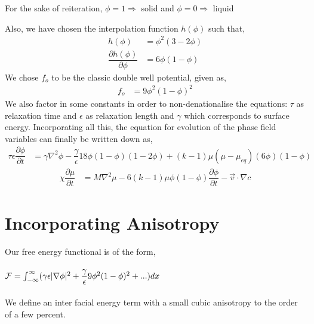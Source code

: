 \documentclass[a4paper]{report}
\begin{document}
For the sake of reiteration,
$\phi = 1 \Longrightarrow$ solid and $\phi = 0 \Longrightarrow$ liquid

Also, we have chosen the interpolation function $h(\phi)$ such that,
\begin{align}
	h(\phi) &= \phi^2\left(3 - 2 \phi\right) \\
	\dfrac{\partial h(\phi)}{\partial \phi} &= 6\phi\left(1-\phi\right)
	\label{interpolation functions}
\end{align}
We chose $f_o$ to be the classic double well potential, given as,
\begin{align}
	f_o &= 9\phi^2\left(1-\phi\right)^2
\end{align}
We also factor in some constants in order to non-denationalise the equations: $\tau$ as relaxation
time and $\epsilon$ as relaxation length and $\gamma$ which corresponds to surface energy.
Incorporating all this, the equation for evolution of the phase field variables 
can finally be written down as,
\begin{align}
\tau\epsilon\dfrac{\partial\phi}{\partial t} &= \gamma\nabla^{2}\phi -\dfrac{\gamma}{\epsilon}18\phi(1-\phi)(1-2\phi)
					+(k - 1)\mu\left(\mu-\mu_{eq}\right)(6\phi)\left(1-\phi\right)
\label{phi_evolution}
\end{align}
\begin{align}
		\chi \dfrac{\partial \mu}{\partial t} &=  M\nabla^2\mu 
	- 6\left(k-1\right)\mu\phi\left(1-\phi\right)\dfrac{\partial\phi}{\partial t}- \vec{v}\cdot\nabla c
\label{mu_evolution}
\end{align}
\section{Incorporating Anisotropy}
Our free energy functional is of the form,\\
 \\
${\cal F} = \int_{-\infty}^{\infty}(\gamma\epsilon|\nabla\phi|^2 + \dfrac{\gamma}{\epsilon}9\phi^2(1-\phi)^2 + ...)dx$\\
 \\
We define an inter facial energy term with a small cubic anisotropy 
to the order of a few percent.\\
\end{document}
